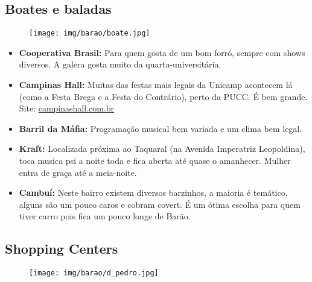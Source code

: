 \subsection{Boates e baladas}

\begin{figure}[h!]
    \centering
    \texttt{[image: img/barao/boate.jpg]}
\end{figure}

\begin{itemize}
    \item   \textbf{Cooperativa Brasil:} Para quem gosta de um bom forró, sempre
        com shows diversos. A galera gosta muito da quarta-universitária.

    \item   \textbf{Campinas Hall:} Muitas das festas mais legais da Unicamp
        acontecem lá (como a Festa Brega e a Festa do Contrário), perto da PUCC.
        É bem grande.
        \\Site: \url{campinashall.com.br}

    \item   \textbf{Barril da Máfia:} Programação musical bem variada e um clima
        bem legal.

    \item   \textbf{Kraft:} Localizada próxima ao Taquaral (na Avenida
        Imperatriz Leopoldina), toca musica psi a noite toda e fica aberta até
        quase o amanhecer. Mulher entra de graça até a meia-noite.

    \item   \textbf{Cambuí:} Neste bairro existem diversos barzinhos, a maioria
        é temático, alguns são um pouco caros e cobram covert. É um ótima
        escolha para quem tiver carro pois fica um pouco longe de Barão.
\end{itemize}

\subsection{Shopping Centers}

\begin{figure}[h!]
    \centering
    \texttt{[image: img/barao/d\_pedro.jpg]}
\end{figure}

